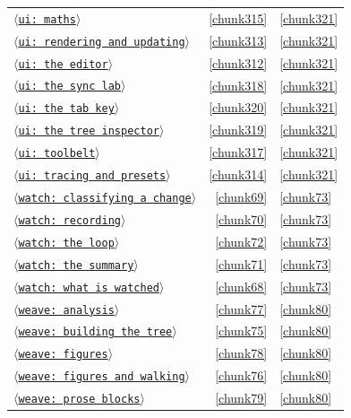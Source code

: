 \documentclass[10pt,a4paper]{article}
\newcounter{chunk}
\newcommand{\chunkname}[1]{\ensuremath{\langle}\texttt{#1}\ensuremath{\rangle}}
\begin{document}
\begin{longtable}{@{}p{}rp{}@{}}
\hyperref[chunk315]{\chunkname{ui: maths}} & \ref*{chunk315} & \hyperref[chunk321]{\ref*{chunk321}} \\
\hyperref[chunk313]{\chunkname{ui: rendering and updating}} & \ref*{chunk313} & \hyperref[chunk321]{\ref*{chunk321}} \\
\hyperref[chunk312]{\chunkname{ui: the editor}} & \ref*{chunk312} & \hyperref[chunk321]{\ref*{chunk321}} \\
\hyperref[chunk318]{\chunkname{ui: the sync lab}} & \ref*{chunk318} & \hyperref[chunk321]{\ref*{chunk321}} \\
\hyperref[chunk320]{\chunkname{ui: the tab key}} & \ref*{chunk320} & \hyperref[chunk321]{\ref*{chunk321}} \\
\hyperref[chunk319]{\chunkname{ui: the tree inspector}} & \ref*{chunk319} & \hyperref[chunk321]{\ref*{chunk321}} \\
\hyperref[chunk317]{\chunkname{ui: toolbelt}} & \ref*{chunk317} & \hyperref[chunk321]{\ref*{chunk321}} \\
\hyperref[chunk314]{\chunkname{ui: tracing and presets}} & \ref*{chunk314} & \hyperref[chunk321]{\ref*{chunk321}} \\
\hyperref[chunk69]{\chunkname{watch: classifying a change}} & \ref*{chunk69} & \hyperref[chunk73]{\ref*{chunk73}} \\
\hyperref[chunk70]{\chunkname{watch: recording}} & \ref*{chunk70} & \hyperref[chunk73]{\ref*{chunk73}} \\
\hyperref[chunk72]{\chunkname{watch: the loop}} & \ref*{chunk72} & \hyperref[chunk73]{\ref*{chunk73}} \\
\hyperref[chunk71]{\chunkname{watch: the summary}} & \ref*{chunk71} & \hyperref[chunk73]{\ref*{chunk73}} \\
\hyperref[chunk68]{\chunkname{watch: what is watched}} & \ref*{chunk68} & \hyperref[chunk73]{\ref*{chunk73}} \\
\hyperref[chunk77]{\chunkname{weave: analysis}} & \ref*{chunk77} & \hyperref[chunk80]{\ref*{chunk80}} \\
\hyperref[chunk75]{\chunkname{weave: building the tree}} & \ref*{chunk75} & \hyperref[chunk80]{\ref*{chunk80}} \\
\hyperref[chunk78]{\chunkname{weave: figures}} & \ref*{chunk78} & \hyperref[chunk80]{\ref*{chunk80}} \\
\hyperref[chunk76]{\chunkname{weave: figures and walking}} & \ref*{chunk76} & \hyperref[chunk80]{\ref*{chunk80}} \\
\hyperref[chunk79]{\chunkname{weave: prose blocks}} & \ref*{chunk79} & \hyperref[chunk80]{\ref*{chunk80}} \\

\end{longtable}
\end{document}
